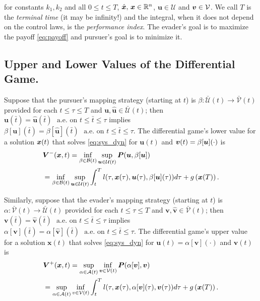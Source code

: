%
for constants $k_1, k_2$ and all 
 $0 \le t \le T$, $\hat{\bm{x}}, \, \bm{x} \in \mathbb{R}^n$, $\bm{u}\in \mathcal{U}$ and $\bm{v} \in \mathcal{V}$. 
We call $T$ is the \textit{terminal time} (it may be infinity!) and the integral, when it does not depend on the control laws, is the \textit{performance index}. The evader's goal is to maximize the payoff \eqref{eq:payoff} and pursuer's goal is to minimize it. %


\subsection{Upper and Lower Values of the Differential Game.}

\noindent Suppose that the pursuer's mapping strategy (starting at $t$) is $\beta: \mathcal{\bar{U}}({t}) \rightarrow \mathcal{\bar{V}}({t})$ provided for each $t \le \tau \le T$ and $\bm{u}, \hat{\bm{u}} \in \mathcal{\bar{U}}({t})$; then $\bm{u}(\bar{t}) = \hat{\bm{u}}(\bar{t}) \,\, \text{ a.e. on } t \le \bar{t}  \le \tau$ implies $\beta[\bm{u}](\bar{t}) = \beta[\hat{\bm{u}}](\bar{t}) \,\, \text{ a.e. on } t \le \bar{t}  \le \tau$.
%
The differential game's lower value for a solution $\bm{x}(t)$ that solves \eqref{eq:sys_dyn} for $\bm{u}(t)$ and $\bm{v}(t) = \beta[\bm{u}](\cdot)$ is 
%
\begin{align}
	&\lowervalue(\state, t) = \inf_{\beta \in \mathcal{B}(t)} \sup_{\bm{u} \in \mathcal{U}(t)} \bm{P}(\bm{u}, \beta[\bm{u}]) \nonumber \\
	&=  \inf_{\beta \in \mathcal{B}(t)} \sup_{\bm{u} \in \mathcal{U}(t)} %
	\int_{t}^{T} l(\tau, \bm{x}(\tau), \bm{u}(\tau), \beta[\bm{u}](\tau)) d\tau + g\left(\bm{x}(T)\right). %
	\label{eq:value_lower}
\end{align}

Similarly, suppose that  the evader's mapping strategy (starting at $t$) is $\alpha: \mathcal{\bar{V}}({t}) \rightarrow \mathcal{\bar{U}}({t})$ provided for each $t \le \tau \le T$ and $\bm{v}, \hat{\bm{v}} \in \mathcal{\bar{V}}({t})$; then  $\bm{v}(\bar{t}) = \hat{\bm{v}}(\bar{t}) \,\, \text{ a.e. on } t \le \bar{t}  \le \tau$ implies $\alpha[\bm{v}](\bar{t}) = \alpha[\hat{\bm{v}}](\bar{t}) \,\, \text{ a.e. on } t \le \bar{t}  \le \tau$. The differential game's upper value for a solution $\bm{x}(t)$ that solves \eqref{eq:sys_dyn} for $\bm{u}(t) = \alpha[\bm{v}](\cdot)$ and $\bm{v}(t)$  is 
%
\begin{align}
	&\uppervalue(\state, t) = \sup_{\alpha \in \mathcal{A}(t)} \inf_{\bm{v} \in \mathcal{V}(t)}  \bm{P}(\alpha[\bm{v}], \bm{v}) \nonumber \\
	&=  \sup_{\alpha \in \mathcal{A}(t)} \inf_{v \in \mathcal{V}(t)} %
	\int_{t}^{T}l(\tau, \bm{x}(\tau), \alpha[\bm{v}](\tau), \bm{v}(\tau)) d\tau  + g\left(\bm{x}(T)\right).
	\label{eq:value_upper}
\end{align}

